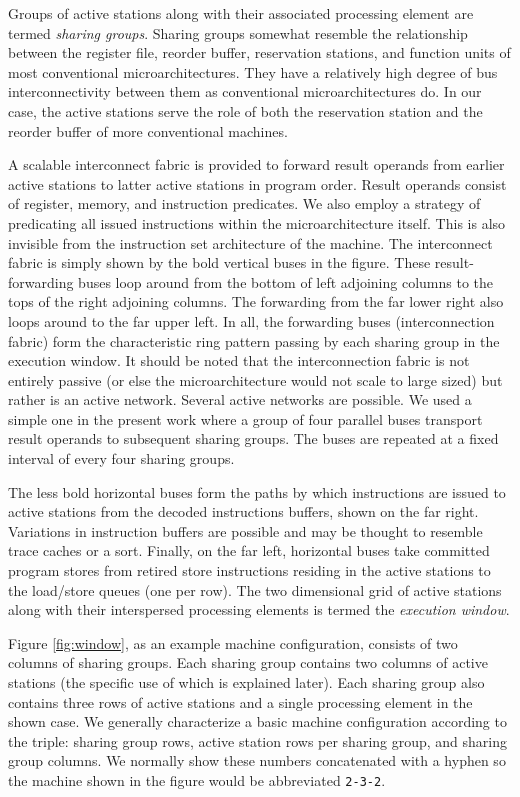 \documentclass[10pt,dvips]{article}
\begin{document}
Groups of active stations along with their associated processing
element
are termed \textit{sharing groups}.  Sharing groups somewhat resemble
the relationship between the register file, reorder buffer,
reservation stations, and function units of most conventional
microarchitectures.  They have a relatively high degree of bus
interconnectivity between them as conventional microarchitectures do.
In our case, the active stations serve the role of both the
reservation station and the reorder buffer of more conventional
machines.

A scalable interconnect fabric 
is provided to forward result
operands from earlier active stations to latter active stations in
program order.  Result operands consist of register, memory, and
instruction predicates.  We also employ a strategy of predicating all
issued instructions within the microarchitecture itself.  This is also 
invisible from the instruction set architecture of the machine.
The interconnect fabric is simply shown by
the bold vertical buses in the figure.  These result-forwarding buses
loop around from the bottom of left adjoining columns to the tops of
the right adjoining columns.  The forwarding from the far lower right
also loops around to the far upper left.  In all, the forwarding
buses (interconnection fabric) form the characteristic ring pattern
passing by each sharing group in the execution window.
It should be noted that the interconnection fabric is not
entirely passive (or else the microarchitecture would not
scale to large sized) but rather is an active network.
Several active networks are possible.  We used a simple one
in the present work where a group of four parallel buses transport
result operands to subsequent sharing groups.  The buses are repeated
at a fixed interval of every four sharing groups.

The less bold horizontal buses
form the paths by which instructions are issued to active stations
from the decoded instructions buffers, shown on the far right.
Variations in instruction buffers are possible and may be thought
to resemble trace caches or a sort.
Finally, on the far left, horizontal buses take committed program
stores from retired store instructions residing in the active stations
to the load/store queues (one per row).
The two dimensional
grid of active stations along with their interspersed processing elements
is termed the \textit{execution window}.

Figure \ref{fig:window}, as an example machine configuration, consists of 
two columns of sharing groups.  Each sharing group contains two columns of
active stations (the specific use of which is explained later).
Each sharing group also contains three rows of active stations
and a single processing element in the shown case.  
We generally characterize
a basic machine configuration according to the triple: sharing group
rows, active station
rows per sharing group, and sharing group columns.  We normally
show these numbers concatenated with a hyphen so the machine shown
in the figure would be abbreviated {\tt 2-3-2}.
\end{document}
